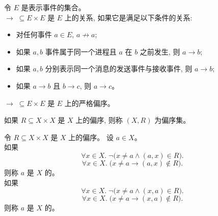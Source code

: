 \begin{frame}{}
\end{frame}

\begin{frame}{}
  \begin{definition}
    令 $E$ 是表示事件的集合。\\[3pt]
    $\to \;\subseteq E \times E$ 是 $E$ 上的关系,
    如果它是满足以下条件的关系: \\[5pt]
    \begin{itemize}
      \setlength{\itemsep}{8pt}
      \item 对任何事件 $a \in E$, $a \not\to a$;
      \item 如果 $a, b$ 事件属于同一个进程且 $a$ 在 $b$ 之前发生, 则 $a \to b$;
      \item 如果 $a, b$ 分别表示同一个消息的发送事件与接收事件, 则 $a \to b$;
      \item 如果 $a \to b$ 且 $b \to c$, 则 $a \to c$。
    \end{itemize}
  \end{definition}

  \pause
  \vspace{0.30cm}
  \begin{theorem}
    $\to \;\subseteq E \times E$ 是 $E$ 上的严格偏序。
  \end{theorem}
\end{frame}

\begin{frame}{}
  \begin{definition}
    如果 $R \subseteq X \times X$ 是 $X$ 上的偏序,
    则称 $(X, R)$ 为偏序集。
  \end{definition}
\end{frame}

\begin{frame}{}
  \begin{definition}
    令 $R \subseteq X \times X$ 是 $X$ 上的偏序。
    设 $a \in X$。\\[5pt]

    \pause
    如果
    \[
      \forall x \in X.\; \lnot \big(x \neq a \land (a, x) \in R \big).
    \]
    \[
      \forall x \in X.\; \big(x \neq a \to (a, x) \notin R \big).
    \]
    则称 $a$ 是 $X$ 的。\\[10pt]

    \pause
    如果
    \[
      \forall x \in X.\; \lnot \big(x \neq a \land (x, a) \in R \big).
    \]
    \[
      \forall x \in X.\; \big(x \neq a \to (x, a) \notin R \big).
    \]
    则称 $a$ 是 $X$ 的。
  \end{definition}

  \pause
  \begin{center}
  \end{center}
\end{frame}

